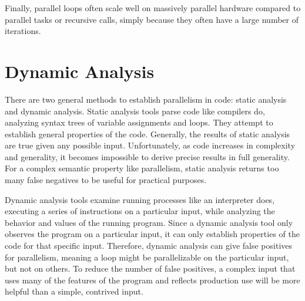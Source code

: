 \documentclass[12pt,twoside]{reedthesis}
\begin{document}
		Finally, parallel loops often scale well on massively parallel hardware compared to parallel tasks or recursive calls, simply because they often have a large number of iterations.
%		
%		
%		
%		
%		
%		
		\section{Dynamic Analysis}
		
			There are two general methods to establish parallelism in code: static analysis and dynamic analysis. Static analysis tools parse code like compilers do, analyzing syntax trees of variable assignments and loops. They attempt to establish general properties of the code. Generally, the results of static analysis are true given any possible input. Unfortunately, as code increases in complexity and generality, it becomes impossible to derive precise results in full generality. 
			For a complex semantic property like parallelism, static analysis returns too many false negatives to be useful for practical purposes. 
			
			Dynamic analysis tools examine running processes like an interpreter does, executing a series of instructions on a particular input, while analyzing the behavior and values of the running program. Since a dynamic analysis tool only observes the program on a particular input, it can only establish properties of the code for that specific input. Therefore, dynamic analysis can give false positives for parallelism, meaning a loop might be parallelizable on the particular input, but not on others. To reduce the number of false positives, a complex input that uses many of the features of the program and reflects production use will be more helpful than a simple, contrived input. 
			
\end{document}
